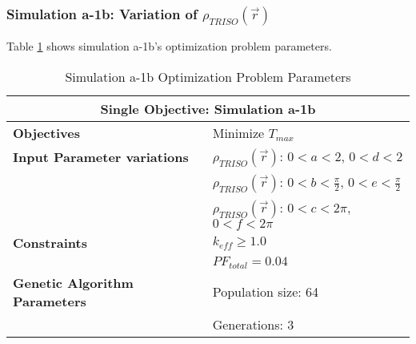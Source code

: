 \subsubsection{Simulation a-1b: Variation of $\rho_{TRISO}(\vec{r})$}
Table \ref{tab:simulationa1b} shows simulation a-1b's optimization problem parameters. 
\begin{table}[htbp!]
    \centering
    \onehalfspacing
    \caption{Simulation a-1b Optimization Problem Parameters}
	\label{tab:simulationa1b}
    \footnotesize
    \begin{tabular}{l|p{5.3cm}}
    \hline 
    \multicolumn{2}{c}{\textbf{Single Objective: Simulation a-1b}} \\
    \hline 
    \textbf{Objectives} & Minimize $T_{max}$ \\
    \hline 
    \textbf{Input Parameter variations} 
    & $\rho_{TRISO}(\vec{r})$: $0<a<2$, $0<d<2$\\
    & $\rho_{TRISO}(\vec{r})$: $0<b<\frac{\pi}{2}$, $0<e<\frac{\pi}{2}$\\
    & $\rho_{TRISO}(\vec{r})$: $0<c<2\pi$, $0<f<2\pi$\\
    \hline
    \textbf{Constraints} & $k_{eff} \geq 1.0$\\ 
    & $PF_{total} = 0.04 $\\ 
    \hline 
    \textbf{Genetic Algorithm Parameters} & Population size: 64 \\
    & Generations: 3 \\
    \hline
    \end{tabular}
\end{table}

